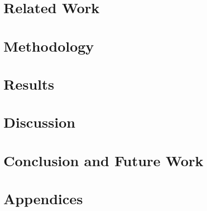 \documentclass[11pt,oneside]{book}
\begin{document}
\chapter{Related Work}\label{ch:related}




\chapter{Methodology}\label{ch:method}














\chapter{Results}\label{ch:results}









\chapter{Discussion}\label{ch:discussion}





\chapter{Conclusion and Future Work}\label{ch:conclusion}



\appendix
\chapter{Appendices}\label{ch:appendix}



\backmatter
\nocite{*}


\end{document}
